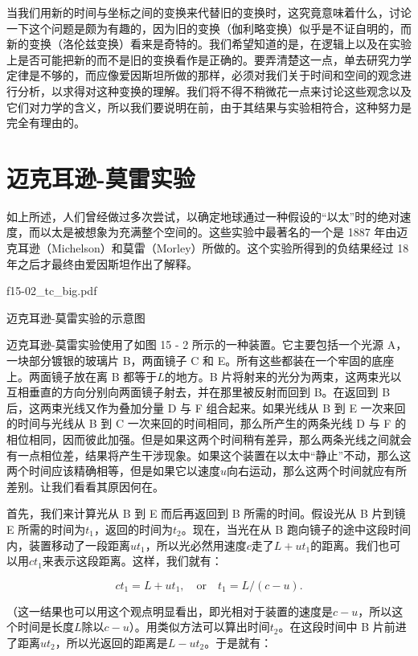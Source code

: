 \documentclass[12pt,oneside]{book}
\begin{document}
当我们用新的时间与坐标之间的变换来代替旧的变换时，这究竟意味着什么，讨论一下这个问题是颇为有趣的，因为旧的变换（伽利略变换）似乎是不证自明的，而新的变换（洛伦兹变换）看来是奇特的。我们希望知道的是，在逻辑上以及在实验上是否可能把新的而不是旧的变换看作是正确的。要弄清楚这一点，单去研究力学定律是不够的，而应像爱因斯坦所做的那样，必须对我们关于时间和空间的观念进行分析，以求得对这种变换的理解。我们将不得不稍微花一点来讨论这些观念以及它们对力学的含义，所以我们要说明在前，由于其结果与实验相符合，这种努力是完全有理由的。


\section{迈克耳逊-莫雷实验}
如上所述，人们曾经做过多次尝试，以确定地球通过一种假设的“以太”时的绝对速度，而以太是被想象为充满整个空间的。这些实验中最著名的一个是 1887 年由迈克耳逊（Michelson）和莫雷（Morley）所做的。这个实验所得到的负结果经过 18 年之后才最终由爱因斯坦作出了解释。

\begin{fig}{f15-02_tc_big.pdf}
\caption{迈克耳逊-莫雷实验的示意图}
\label{fig:15-2}
\end{fig}

迈克耳逊-莫雷实验使用了如图 15 - 2 所示的一种装置。它主要包括一个光源 A，一块部分镀银的玻璃片 B，两面镜子 C 和 E。所有这些都装在一个牢固的底座上。两面镜子放在离 B 都等于$L$的地方。B 片将射来的光分为两束，这两束光以互相垂直的方向分别向两面镜子射去，并在那里被反射而回到 B。在返回到 B 后，这两束光线又作为叠加分量 D 与 F 组合起来。如果光线从 B 到 E 一次来回的时间与光线从 B 到 C 一次来回的时间相同，那么所产生的两条光线 D 与 F 的相位相同，因而彼此加强。但是如果这两个时间稍有差异，那么两条光线之间就会有一点相位差，结果将产生干涉现象。如果这个装置在以太中“静止”不动，那么这两个时间应该精确相等，但是如果它以速度$u$向右运动，那么这两个时间就应有所差别。让我们看看其原因何在。


首先，我们来计算光从 B 到 E 而后再返回到 B 所需的时间。假设光从 B 片到镜 E 所需的时间为$t_1$，返回的时间为$t_2$。现在，当光在从 B 跑向镜子的途中这段时间内，装置移动了一段距离$ut_1$，所以光必然用速度$c$走了$L + ut_1$的距离。我们也可以用$ct_1$来表示这段距离。这样，我们就有：


\begin{equation*}
ct_1=L+ut_1,\quad
\text{or}\quad
t_1=L/(c-u).
\end{equation*}

（这一结果也可以用这个观点明显看出，即光相对于装置的速度是$c - u$，所以这个时间是长度$L$除以$c - u$）。用类似方法可以算出时间$t_2$。在这段时间中 B 片前进了距离$ut_2$，所以光返回的距离是$L - ut_2$。于是就有：
\end{document}
